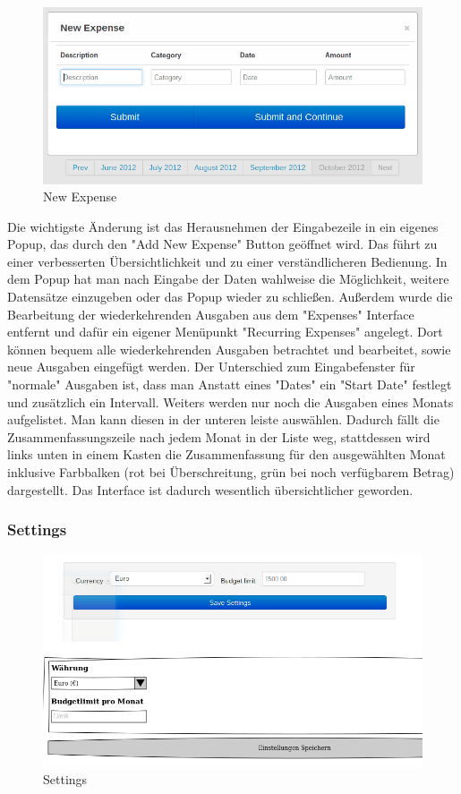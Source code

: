 \documentclass[a4paper,10pt]{article}
\begin{document}
\begin{figure}
\centering
\includegraphics[width=\textwidth]{expenses-new-ip}
\caption{New Expense} \label{fig:expenses-new}
\end{figure}

Die wichtigste \"Anderung ist das Herausnehmen der Eingabezeile in ein eigenes Popup, das durch den "Add New Expense" Button
ge\"offnet wird. Das f\"uhrt zu einer verbesserten \"Ubersichtlichkeit und zu einer verst\"andlicheren Bedienung.
In dem Popup hat man nach Eingabe der Daten wahlweise die M\"oglichkeit, weitere Datens\"atze einzugeben oder das Popup wieder
zu schließen. Außerdem wurde die Bearbeitung der wiederkehrenden Ausgaben aus dem "Expenses" Interface entfernt und dafür
ein eigener Menüpunkt "Recurring Expenses" angelegt. Dort können bequem alle wiederkehrenden Ausgaben betrachtet und
bearbeitet, sowie neue Ausgaben eingef\"ugt werden. Der Unterschied zum Eingabefenster für "normale" Ausgaben ist,
dass man Anstatt eines "Dates" ein "Start Date" festlegt und zusätzlich ein Intervall.
Weiters werden nur noch die Ausgaben eines Monats aufgelistet. Man kann diesen in der unteren leiste auswählen. Dadurch f\"allt
die Zusammenfassungszeile nach jedem Monat in der Liste weg, stattdessen wird links unten in einem Kasten die Zusammenfassung
für den ausgewählten Monat inklusive Farbbalken (rot bei \"Uberschreitung, grün bei noch verf\"ugbarem Betrag) dargestellt.
Das Interface ist dadurch wesentlich übersichtlicher geworden.

\clearpage
\subsubsection{Settings}

\begin{figure}
\centering
\includegraphics[width=\textwidth]{settings}
\caption{Settings} \label{fig:settings}
\end{figure}
\end{document}
